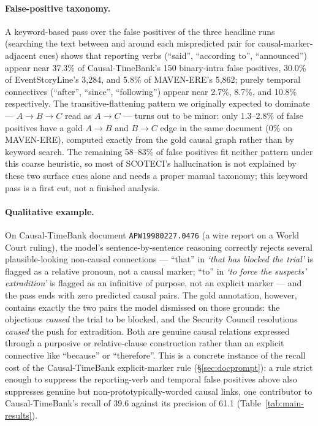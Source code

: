 \documentclass[11pt]{article}
\newcommand{\method}{SCOTECI}
\begin{document}
\paragraph{False-positive taxonomy.} A keyword-based pass over the false positives
of the three headline runs (searching the text between and around each
mispredicted pair for causal-marker-adjacent cues) shows that reporting verbs
(``said'', ``according to'', ``announced'') appear near 37.3\% of
Causal-TimeBank's 150 binary-intra false positives, 30.0\% of EventStoryLine's
3{,}284, and 5.8\% of MAVEN-ERE's 5{,}862; purely temporal connectives (``after'',
``since'', ``following'') appear near 2.7\%, 8.7\%, and 10.8\% respectively. The
transitive-flattening pattern we originally expected to dominate --- $A \to B \to
C$ read as $A \to C$ --- turns out to be minor: only 1.3--2.8\% of false positives
have a gold $A \to B$ and $B \to C$ edge in the same document (0\% on MAVEN-ERE),
computed exactly from the gold causal graph rather than by keyword search. The
remaining 58--83\% of false positives fit neither pattern under this coarse
heuristic, so most of \method{}'s hallucination is not explained by these two
surface cues alone and needs a proper manual taxonomy; this keyword pass is a
first cut, not a finished analysis.

\paragraph{Qualitative example.} On Causal-TimeBank document
\texttt{APW19980227.0476} (a wire report on a World Court ruling), the model's
sentence-by-sentence reasoning correctly rejects several plausible-looking
non-causal connections --- ``that'' in \emph{`that has blocked the trial'} is
flagged as a relative pronoun, not a causal marker; ``to'' in \emph{`to force the
suspects' extradition'} is flagged as an infinitive of purpose, not an explicit
marker --- and the pass ends with zero predicted causal pairs. The gold
annotation, however, contains exactly the two pairs the model dismissed on those
grounds: the objections \emph{caused} the trial to be blocked, and the Security
Council resolutions \emph{caused} the push for extradition. Both are genuine
causal relations expressed through a purposive or relative-clause construction
rather than an explicit connective like ``because'' or ``therefore''. This is a
concrete instance of the recall cost of the Causal-TimeBank explicit-marker rule
(\S\ref{sec:docprompt}): a rule strict enough to suppress the reporting-verb and
temporal false positives above also suppresses genuine but
non-prototypically-worded causal links, one contributor to Causal-TimeBank's
recall of 39.6 against its precision of 61.1 (Table~\ref{tab:main-results}).
\end{document}
